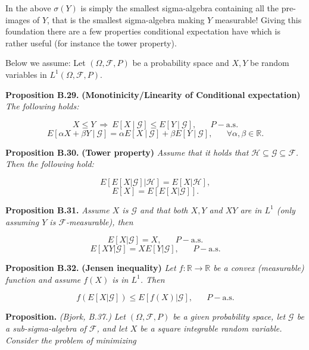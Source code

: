 \documentclass[
]{article}
\begin{document}
In the above \(\sigma(Y)\) is simply the smallest sigma-algebra
containing all the pre-images of \(Y\), that is the smallest
sigma-algebra making \(Y\) measurable! Giving this foundation there are
a few properties conditional expectation have which is rather useful
(for instance the tower property).

Below we assume: Let \((\Omega,\mathcal{F},P)\) be a probability space
and \(X,Y\) be random variables in \(L^1(\Omega,\mathcal{F},P)\).

\textbf{Proposition B.29.} \textbf{(Monotinicity/Linearity of
Conditional expectation)} \emph{The following holds:}

\[X\le Y\ \Rightarrow\ E[X\ \vert\ \mathcal{G}]\le E[Y\ \vert\ \mathcal{G}],\hspace{20pt}P-\text{a.s.}\tag{B.6}\]
\[E[\alpha X + \beta Y\ \vert\ \mathcal{G}]=\alpha E[X\ \vert\ \mathcal{G}]+ \beta E[Y\ \vert\ \mathcal{G}],\hspace{20pt}\forall \alpha,\beta\in\mathbb{R}.\tag{B.7}\]

\textbf{Proposition B.30.} \textbf{(Tower property)} \emph{Assume that
it holds that \(\mathcal{H}\subseteq\mathcal{G}\subseteq\mathcal{F}\).
Then the following hold:}

\[E[E[X\vert \mathcal{G}]\vert\mathcal{H}]=E[X\vert \mathcal{H}],\tag{B.8}\]
\[E[X]=E[E[X\vert \mathcal{G}]].\tag{B.9}\]

\textbf{Proposition B.31.} \emph{Assume \(X\) is \(\mathcal{G}\) and
that both \(X,Y\) and \(XY\) are in \(L^1\) (only assuming \(Y\) is
\(\mathcal{F}\)-measurable), then}

\[E[X\vert\mathcal{G}]=X,\hspace{20pt}P-\text{a.s.}\tag{B.11}\]
\[E[XY\vert\mathcal{G}]=XE[Y\vert\mathcal{G}],\hspace{20pt}P-\text{a.s.}\tag{B.12}\]

\textbf{Proposition B.32.} \textbf{(Jensen inequality)} \emph{Let
\(f:\mathbb{R}\to\mathbb{R}\) be a convex (measurable) function and
assume \(f(X)\) is in \(L^1\). Then}

\[f(E[X\vert\mathcal{G}])\le E[f(X)\vert\mathcal{G}],\hspace{20pt}P-\text{a.s.}\]

\textbf{Proposition.} \emph{(Bjork, B.37.)} \emph{Let
\((\Omega,\mathcal{F},P)\) be a given probability space, let
\(\mathcal{G}\) be a sub-sigma-algebra of \(\mathcal{F}\), and let \(X\)
be a square integrable random variable. Consider the problem of
minimizing}
\end{document}
